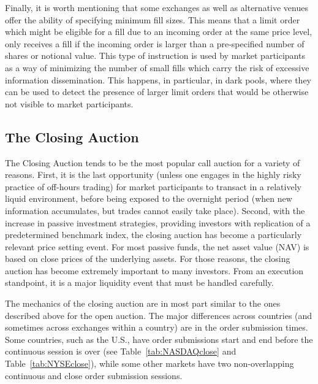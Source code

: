 Finally, it is worth mentioning that some exchanges as well as alternative venues offer the ability of specifying minimum fill sizes. This means that a limit order which might be eligible for a fill due to an incoming order at the same price level, only receives a fill if the incoming order is larger than a pre-specified number of shares or notional value. This type of instruction is used by market participants as a way of minimizing the number of small fills which carry the risk of excessive information dissemination. This happens, in particular, in dark pools, where they can be used to detect the presence of larger limit orders that would be otherwise not visible to market participants.  \label{in:cont_trade2}



\subsection{The Closing Auction\label{sec:the_closing_auction}} \label{in:close2}

The Closing Auction tends to be the most popular call auction for a variety of reasons. First, it is the last opportunity (unless one engages in the highly risky practice of off-hours trading) for market participants to transact in a relatively liquid environment, before being exposed to the overnight period (when new information accumulates, but trades cannot easily take place). Second, with the increase in passive investment strategies, providing investors with replication of a predetermined benchmark index, the closing auction has become a particularly relevant price setting event. For most passive funds, the net asset value (NAV) is based on close prices of the underlying assets. For those reasons, the closing auction has become extremely important to many investors. From an execution standpoint, it is a major liquidity event that must be handled carefully.


The mechanics of the closing auction are in most part similar to the ones described above for the open auction. The major differences across countries (and sometimes across exchanges within a country) are in the order submission times. Some countries, such as the U.S., have order submissions start and end before the continuous session is over (see Table~\ref{tab:NASDAQclose} and Table~\ref{tab:NYSEclose}), while some other markets have two non-overlapping continuous and close order submission sessions.

